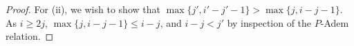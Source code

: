 \documentclass[10pt]{article}
\makeatletter
\newcommand{\produces}[3]{{#1}{#3}{#2}}
\renewcommand{\Q}{Q}
\newcommand{\minDim}{m}
\newcommand{\minDimP}{\overline{m}}
\renewcommand{\produces}[3]{
{
\def\labelstyle{\scriptstyle}
\xymatrix@C=2em@1{
{#1}
\ar@{-}[r]|-{{\,#3\,}}
&%
{#2}%
}}}
\makeatother
\begin{document}
\begin{SteenrodAlgebrasAndTheirKoszulDuals}
\begin{proof}
For (ii), we wish to show that $\max\{j',i'-j'-1\}>\max\{j,i-j-1\}$. 
As $i\geq2j$, $\max\{j,i-j-1\}\leq i-j$, and $i-j<j'$ by inspection of the $P$-Adem relation.
\end{proof}
%
%



\end{SteenrodAlgebrasAndTheirKoszulDuals}
\end{document}
